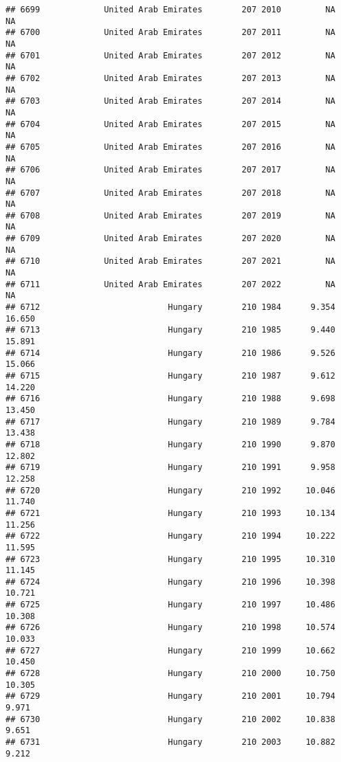 \documentclass[
]{article}
\begin{document}
\begin{verbatim}
## 6699             United Arab Emirates        207 2010         NA         NA
## 6700             United Arab Emirates        207 2011         NA         NA
## 6701             United Arab Emirates        207 2012         NA         NA
## 6702             United Arab Emirates        207 2013         NA         NA
## 6703             United Arab Emirates        207 2014         NA         NA
## 6704             United Arab Emirates        207 2015         NA         NA
## 6705             United Arab Emirates        207 2016         NA         NA
## 6706             United Arab Emirates        207 2017         NA         NA
## 6707             United Arab Emirates        207 2018         NA         NA
## 6708             United Arab Emirates        207 2019         NA         NA
## 6709             United Arab Emirates        207 2020         NA         NA
## 6710             United Arab Emirates        207 2021         NA         NA
## 6711             United Arab Emirates        207 2022         NA         NA
## 6712                          Hungary        210 1984      9.354     16.650
## 6713                          Hungary        210 1985      9.440     15.891
## 6714                          Hungary        210 1986      9.526     15.066
## 6715                          Hungary        210 1987      9.612     14.220
## 6716                          Hungary        210 1988      9.698     13.450
## 6717                          Hungary        210 1989      9.784     13.438
## 6718                          Hungary        210 1990      9.870     12.802
## 6719                          Hungary        210 1991      9.958     12.258
## 6720                          Hungary        210 1992     10.046     11.740
## 6721                          Hungary        210 1993     10.134     11.256
## 6722                          Hungary        210 1994     10.222     11.595
## 6723                          Hungary        210 1995     10.310     11.145
## 6724                          Hungary        210 1996     10.398     10.721
## 6725                          Hungary        210 1997     10.486     10.308
## 6726                          Hungary        210 1998     10.574     10.033
## 6727                          Hungary        210 1999     10.662     10.450
## 6728                          Hungary        210 2000     10.750     10.305
## 6729                          Hungary        210 2001     10.794      9.971
## 6730                          Hungary        210 2002     10.838      9.651
## 6731                          Hungary        210 2003     10.882      9.212

\end{verbatim}
\end{document}
